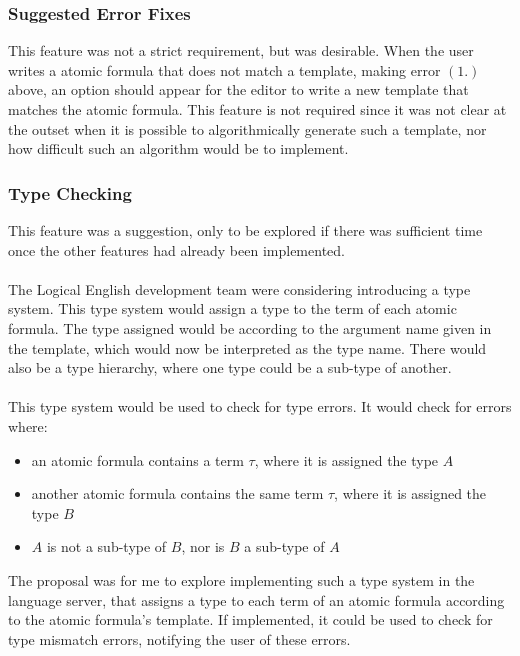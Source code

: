 \documentclass[../main.tex]{subfiles}
\begin{document}
\subsubsection{Suggested Error Fixes}
This feature was not a strict requirement, but was desirable. When the user writes a atomic formula that does not match a template, making error $(1.)$ above, an option should appear for the editor to write a new template that matches the atomic formula. This feature is not required since it was not clear at the outset when it is possible to algorithmically generate such a template, nor how difficult such an algorithm would be to implement.

\subsubsection{Type Checking}
This feature was a suggestion, only to be explored if there was sufficient time once the other features had already been implemented. 
\\
\\
The Logical English development team were considering introducing a type system. This type system would assign a type to the term of each atomic formula. The type assigned would be according to the argument name given in the template, which would now be interpreted as the type name. There would also be a type hierarchy, where one type could be a sub-type of another. 
\\
\\
This type system would be used to check for type errors. It would check for errors where:
\begin{itemize}
    \item an atomic formula contains a term $\tau$, where it is assigned the type $A$
    \item another atomic formula contains the same term $\tau$, where it is assigned the type $B$
    \item $A$ is not a sub-type of $B$, nor is $B$ a sub-type of $A$
\end{itemize}
The proposal was for me to explore implementing such a type system in the language server, that assigns a type to each term of an atomic formula according to the atomic formula's template. If implemented, it could be used to check for type mismatch errors, notifying the user of these errors. 
\end{document}
